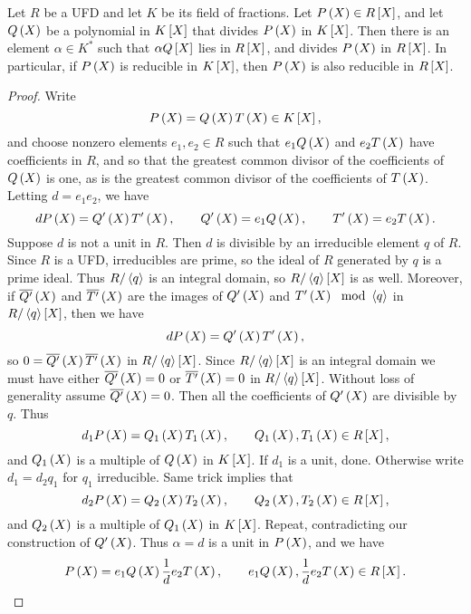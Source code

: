 \begin{theorem}
\label{thm:9.2.1}
Let $ R $ be a UFD and let $ K $ be its field of fractions. Let $ P\br{X} \in R\sbr{X} $, and let $ Q\br{X} $ be a polynomial in $ K\sbr{X} $ that divides $ P\br{X} $ in $ K\sbr{X} $. Then there is an element $ \alpha \in K^* $ such that $ \alpha Q\sbr{X} $ lies in $ R\sbr{X} $, and divides $ P\br{X} $ in $ R\sbr{X} $. In particular, if $ P\br{X} $ is reducible in $ K\sbr{X} $, then $ P\br{X} $ is also reducible in $ R\sbr{X} $.
\end{theorem}

\begin{proof}
Write
$$ P\br{X} = Q\br{X}T\br{X} \in K\sbr{X}, $$
and choose nonzero elements $ e_1, e_2 \in R $ such that $ e_1Q\br{X} $ and $ e_2T\br{X} $ have coefficients in $ R $, and so that the greatest common divisor of the coefficients of $ Q\br{X} $ is one, as is the greatest common divisor of the coefficients of $ T\br{X} $. Letting $ d = e_1e_2 $, we have
$$ dP\br{X} = Q'\br{X}T'\br{X}, \qquad Q'\br{X} = e_1Q\br{X}, \qquad T'\br{X} = e_2T\br{X}. $$
Suppose $ d $ is not a unit in $ R $. Then $ d $ is divisible by an irreducible element $ q $ of $ R $. Since $ R $ is a UFD, irreducibles are prime, so the ideal of $ R $ generated by $ q $ is a prime ideal. Thus $ R / \left\langle q \right\rangle $ is an integral domain, so $ R / \abr{q}\sbr{X} $ is as well. Moreover, if $ \overline{Q'}\br{X} $ and $ \overline{T'}\br{X} $ are the images of $ Q'\br{X} $ and $ T'\br{X} \mod \abr{q} $ in $ R / \abr{q}\sbr{X} $, then we have
$$ dP\br{X} = Q'\br{X}T'\br{X}, $$
so $ 0 = \overline{Q'}\br{X}\overline{T'}\br{X} $ in $ R / \abr{q}\sbr{X} $. Since $ R / \abr{q}\sbr{X} $ is an integral domain we must have either $ \overline{Q'}\br{X} = 0 $ or $ \overline{T'}\br{X} = 0 $ in $ R / \abr{q}\sbr{X} $. Without loss of generality assume $ \overline{Q'}\br{X} = 0 $. Then all the coefficients of $ Q'\br{X} $ are divisible by $ q $. Thus
$$ d_1P\br{X} = Q_1\br{X}T_1\br{X}, \qquad Q_1\br{X}, T_1\br{X} \in R\sbr{X}, $$
and $ Q_1\br{X} $ is a multiple of $ Q\br{X} $ in $ K\sbr{X} $. If $ d_1 $ is a unit, done. Otherwise write $ d_1 = d_2q_1 $ for $ q_1 $ irreducible. Same trick implies that
$$ d_2P\br{X} = Q_2\br{X}T_2\br{X}, \qquad Q_2\br{X}, T_2\br{X} \in R\sbr{X}, $$
and $ Q_2\br{X} $ is a multiple of $ Q_1\br{X} $ in $ K\sbr{X} $. Repeat, contradicting our construction of $ Q'\br{X} $. Thus $ \alpha = d $ is a unit in $ P\br{X} $, and we have
$$ P\br{X} = e_1Q\br{X}\dfrac{1}{d}e_2T\br{X}, \qquad e_1Q\br{X}, \dfrac{1}{d}e_2T\br{X} \in R\sbr{X}. $$
\end{proof}

